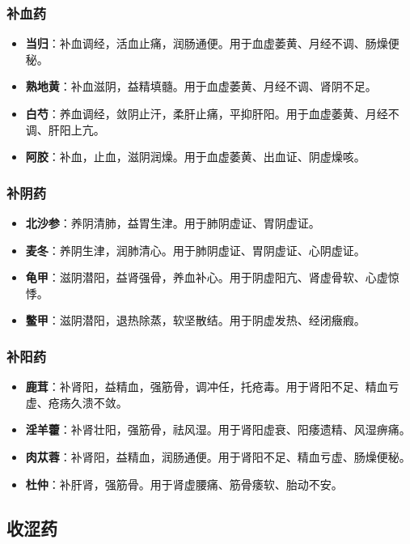 \documentclass[12pt,UTF8]{ctexbook}
\begin{document}
\subsubsection{补血药}

\begin{itemize}
\item \textbf{当归}：补血调经，活血止痛，润肠通便。用于血虚萎黄、月经不调、肠燥便秘。
\item \textbf{熟地黄}：补血滋阴，益精填髓。用于血虚萎黄、月经不调、肾阴不足。
\item \textbf{白芍}：养血调经，敛阴止汗，柔肝止痛，平抑肝阳。用于血虚萎黄、月经不调、肝阳上亢。
\item \textbf{阿胶}：补血，止血，滋阴润燥。用于血虚萎黄、出血证、阴虚燥咳。
\end{itemize}

\subsubsection{补阴药}

\begin{itemize}
\item \textbf{北沙参}：养阴清肺，益胃生津。用于肺阴虚证、胃阴虚证。
\item \textbf{麦冬}：养阴生津，润肺清心。用于肺阴虚证、胃阴虚证、心阴虚证。
\item \textbf{龟甲}：滋阴潜阳，益肾强骨，养血补心。用于阴虚阳亢、肾虚骨软、心虚惊悸。
\item \textbf{鳖甲}：滋阴潜阳，退热除蒸，软坚散结。用于阴虚发热、经闭癥瘕。
\end{itemize}

\subsubsection{补阳药}

\begin{itemize}
\item \textbf{鹿茸}：补肾阳，益精血，强筋骨，调冲任，托疮毒。用于肾阳不足、精血亏虚、疮疡久溃不敛。
\item \textbf{淫羊藿}：补肾壮阳，强筋骨，祛风湿。用于肾阳虚衰、阳痿遗精、风湿痹痛。
\item \textbf{肉苁蓉}：补肾阳，益精血，润肠通便。用于肾阳不足、精血亏虚、肠燥便秘。
\item \textbf{杜仲}：补肝肾，强筋骨。用于肾虚腰痛、筋骨痿软、胎动不安。
\end{itemize}

\subsection{收涩药}
\end{document}
